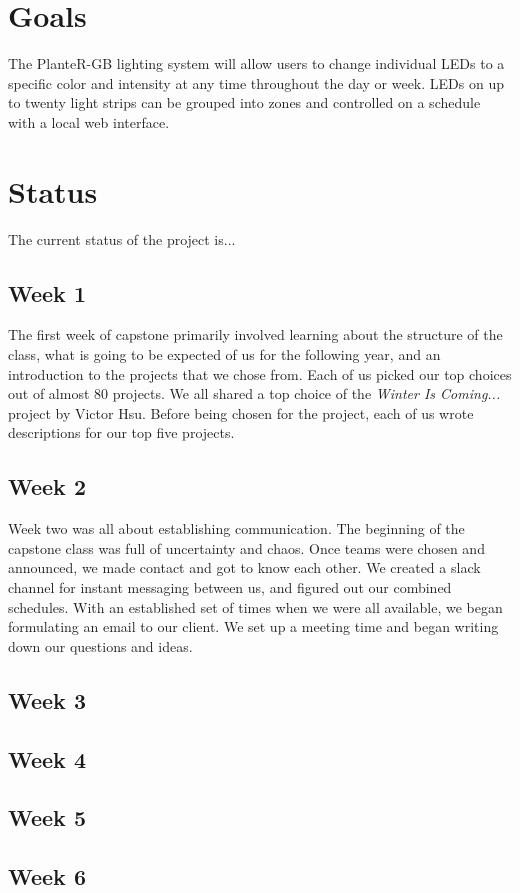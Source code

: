 \documentclass[onecolumn, draftclsnofoot,10pt, compsoc]{IEEEtran}
\begin{document}
	\section{Goals}
	The PlanteR-GB lighting system will allow users to change individual LEDs to a specific color and intensity at any time throughout the day or week.
	LEDs on up to twenty light strips can be grouped into zones and controlled on a schedule with a local web interface.

	\section{Status}
	The current status of the project is...
		\subsection{Week 1}
		The first week of capstone primarily involved learning about the structure of the class, what is going to be expected of us for the following year, and an introduction to the projects that we chose from.
		Each of us picked our top choices out of almost 80 projects. We all shared a top choice of the \textit{Winter Is Coming...} project by Victor Hsu.
		Before being chosen for the project, each of us wrote descriptions for our top five projects.
		\subsection{Week 2}
		Week two was all about establishing communication. The beginning of the capstone class was full of uncertainty and chaos.
		Once teams were chosen and announced, we made contact and got to know each other. We created a slack channel for instant messaging between us, and figured out our combined schedules.
		With an established set of times when we were all available, we began formulating an email to our client. We set up a meeting time and began writing down our questions and ideas.
			
		\subsection{Week 3}
		\subsection{Week 4}
		\subsection{Week 5}
		\subsection{Week 6}
\end{document}
